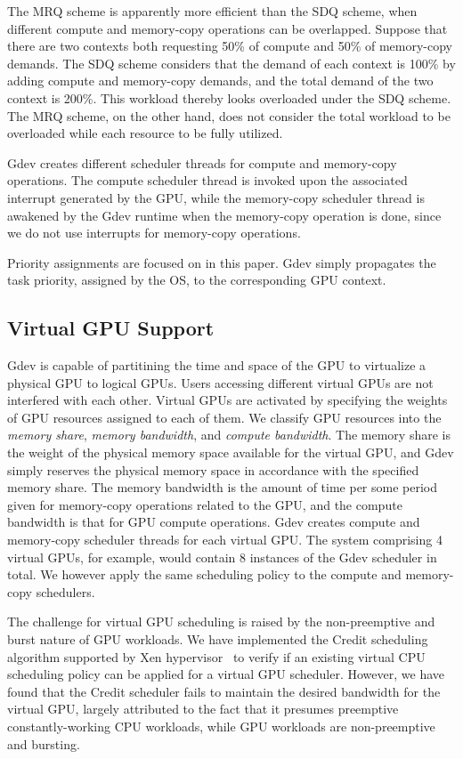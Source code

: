 The MRQ scheme is apparently more efficient than the SDQ scheme, when
different compute and memory-copy operations can be overlapped.
Suppose that there are two contexts both requesting 50\% of compute
and 50\% of memory-copy demands.
The SDQ scheme considers that the demand of each context is 100\% by
adding compute and memory-copy demands, and the total demand of the
two context is 200\%.
This workload thereby looks overloaded under the SDQ scheme.
The MRQ scheme, on the other hand, does not consider the total workload
to be overloaded while each resource to be fully utilized.

Gdev creates different scheduler threads for compute and memory-copy
operations. 
The compute scheduler thread is invoked upon the associated interrupt
generated by the GPU, while the memory-copy scheduler thread is awakened
by the Gdev runtime when the memory-copy operation is done, since we do
not use interrupts for memory-copy operations.

Priority assignments are focused on in this paper.
Gdev simply propagates the task priority, assigned by the OS, to the
corresponding GPU context. 

\subsection{Virtual GPU Support}
\label{sec:virtual_gpu}

Gdev is capable of partitining the time and space of the GPU to
virtualize a physical GPU to logical GPUs.
Users accessing different virtual GPUs are not interfered with each
other.
Virtual GPUs are activated by specifying the weights of GPU resources
assigned to each of them.
We classify GPU resources into the \textit{memory share}, \textit{memory
bandwidth}, and \textit{compute bandwidth}.
The memory share is the weight of the physical memory space available
for the virtual GPU, and Gdev simply reserves the physical memory space
in accordance with the specified memory share.
The memory bandwidth is the amount of time per some period given for
memory-copy operations related to the GPU, and the compute bandwidth is
that for GPU compute operations.
Gdev creates compute and memory-copy scheduler threads for each virtual
GPU.
The system comprising 4 virtual GPUs, for example, would contain 8
instances of the Gdev scheduler in total.
We however apply the same scheduling policy to the compute and
memory-copy schedulers.

The challenge for virtual GPU scheduling is raised by the non-preemptive
and burst nature of GPU workloads.
We have implemented the Credit scheduling algorithm supported by Xen
hypervisor~\cite{Barham_SOSP03} to verify if an existing virtual CPU
scheduling policy can be applied for a virtual GPU scheduler.
However, we have found that the Credit scheduler fails to maintain the
desired bandwidth for the virtual GPU, largely attributed to the fact
that it presumes preemptive constantly-working CPU workloads, while GPU
workloads are non-preemptive and bursting.

